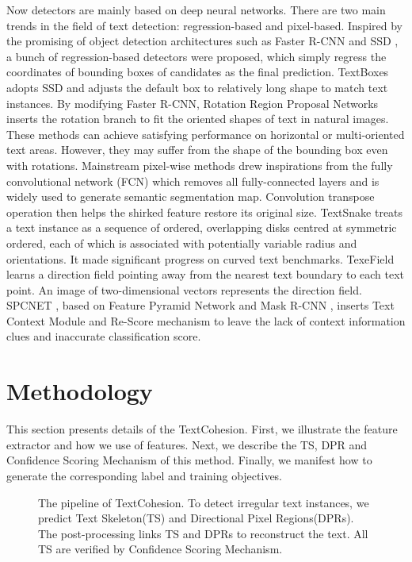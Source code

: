 \documentclass{bmvc2k}
\begin{document}
Now detectors are mainly based on deep neural networks. There are two main trends in the field of text detection: regression-based and pixel-based. Inspired by the promising of object detection architectures such as Faster R-CNN \cite{Ren2015Faster} and SSD \cite{liu2016ssd}, a bunch of regression-based detectors were proposed, which simply regress the coordinates of bounding boxes of candidates as the final prediction. TextBoxes \cite{liao2017textboxes} adopts SSD and adjusts the default box to relatively long shape to match text instances. By modifying Faster R-CNN, Rotation Region Proposal Networks \cite{ma2018arbitrary} inserts the rotation branch to fit the oriented shapes of text in natural images. These methods can achieve satisfying performance on horizontal or multi-oriented text areas. However, they may suffer from the shape of the bounding box even with rotations.
Mainstream pixel-wise methods drew inspirations from the fully convolutional network (FCN) \cite{long2015fully} which removes all fully-connected layers and is widely used to generate semantic segmentation map. Convolution transpose operation then helps the shirked feature restore its original size. TextSnake \cite{long2018textsnake} treats a text instance as a sequence of ordered, overlapping disks centred at symmetric ordered, each of which is associated with potentially variable radius and orientations. It made significant progress on curved text benchmarks. TexeField \cite{xu2019textfield} learns a direction field pointing away from the nearest text boundary to each text point. An image of two-dimensional vectors represents the direction field. SPCNET \cite{xie2018scene}, based on Feature Pyramid Network \cite{Lin2017Feature} and Mask R-CNN \cite{he2017mask}, inserts Text Context Module and Re-Score mechanism to leave the lack of context information clues and inaccurate classification score.

    \section{Methodology}
This section presents details of the TextCohesion. First, we illustrate the feature extractor and how we use of features. Next, we describe the TS, DPR and Confidence Scoring Mechanism of this method. Finally, we manifest how to generate the corresponding label and training objectives.
            \begin{figure*}[!htbp]
            \begin{center}
            \end{center}
               \caption{The pipeline of TextCohesion. To detect irregular text instances, we predict Text Skeleton(TS) and Directional Pixel Regions(DPRs). The post-processing links TS and DPRs to reconstruct the text. All TS are verified by Confidence Scoring Mechanism.}
            \label{ppl}
            \end{figure*}
\end{document}
